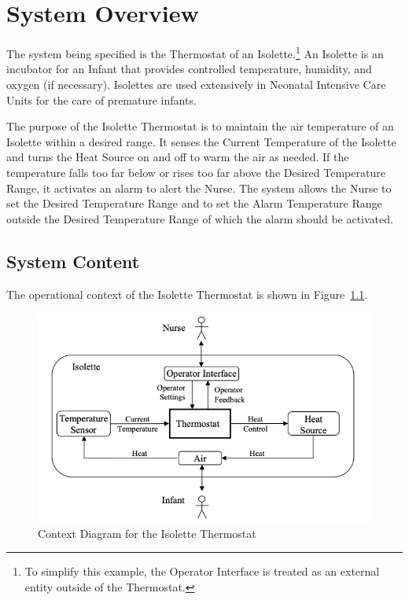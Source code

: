 \chapter{System Overview}
\label{chap:system-overview}

The system being specified is the Thermostat of an Isolette.\footnote{To simplify this example, the Operator Interface is treated as an external entity outside of the Thermostat.}  An Isolette is an incubator for an Infant that provides controlled temperature, humidity, and oxygen (if necessary). Isolettes are used extensively in Neonatal Intensive Care Units for the care of premature infants.

The purpose of the Isolette Thermostat is to maintain the air temperature of an Isolette within a desired range. It senses the Current Temperature of the Isolette and turns the Heat Source on and off to warm the air as needed. If the temperature falls too far below or rises too far above the Desired Temperature Range, it activates an alarm to alert the Nurse. The system allows the Nurse to set the Desired Temperature Range and to set the Alarm Temperature Range outside the Desired Temperature Range of which the alarm should be activated.

\section{System Content}
\label{sec:system-content}

The operational context of the Isolette Thermostat is shown in Figure~\ref{fig:state-concepts}.

\begin{figure}[ht]
  \centerline{\includegraphics[width=\textwidth]{figures/thermostat-context-diagram.png}}
  \vspace{-.4cm}
  \caption{Context Diagram for the Isolette Thermostat}
  \vspace{-.4cm}
 \label{fig:state-concepts}
\end{figure}



